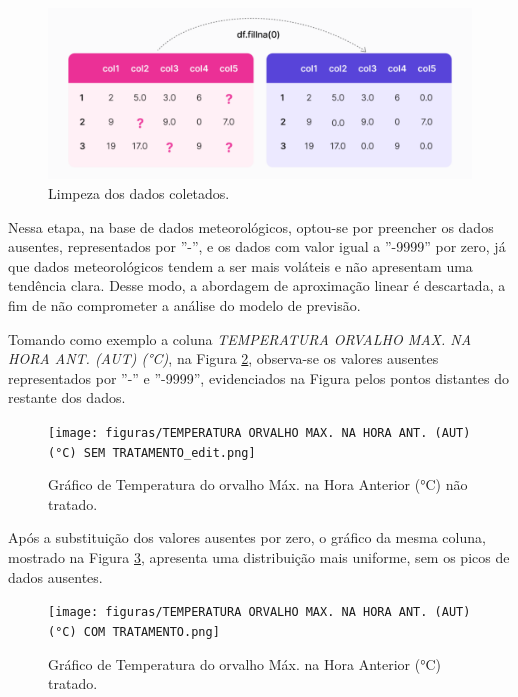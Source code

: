 \begin{figure}[H]
	\caption{\label{fig:passo_dados_limpeza}Limpeza dos dados coletados.}
	\begin{center}
		\includegraphics[scale=0.4]{figuras/step_data_cleaning.png}
	\end{center}
\end{figure}

Nessa etapa, na base de dados meteorológicos, optou-se por preencher os dados ausentes, representados por ''-'', e os dados com valor igual a ''-9999'' por zero, já que dados meteorológicos tendem a ser mais voláteis e não apresentam uma tendência clara. Desse modo, a abordagem de aproximação linear é descartada, a fim de não comprometer a análise do modelo de previsão.  

Tomando como exemplo a coluna \textit{TEMPERATURA ORVALHO MAX. NA HORA ANT. (AUT) (°C)}, na Figura \ref{fig:dados_clima_poa_nao_tratados}, observa-se os valores ausentes representados por ''-'' e ''-9999'', evidenciados na Figura pelos pontos distantes do restante dos dados.

\begin{figure}[H]
	\caption{\label{fig:dados_clima_poa_nao_tratados}Gráfico de Temperatura do orvalho Máx. na Hora Anterior (°C) não tratado.}
	\begin{center}
		\texttt{[image: figuras/TEMPERATURA ORVALHO MAX. NA HORA ANT. (AUT) (°C) SEM TRATAMENTO\_edit.png]}
	\end{center}
\end{figure}

Após a substituição dos valores ausentes por zero, o gráfico da mesma coluna, mostrado na Figura \ref{fig:dados_clima_poa_tratados}, apresenta uma distribuição mais uniforme, sem os picos de dados ausentes.

\begin{figure}[H]
	\caption{\label{fig:dados_clima_poa_tratados}Gráfico de Temperatura do orvalho Máx. na Hora Anterior (°C) tratado.}
	\begin{center}
		\texttt{[image: figuras/TEMPERATURA ORVALHO MAX. NA HORA ANT. (AUT) (°C) COM TRATAMENTO.png]}
	\end{center}
\end{figure}

